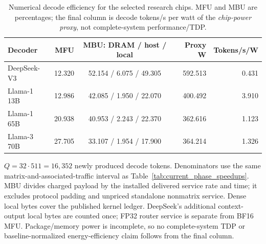 \begin{table}[htbp]
\centering\small
\caption{Numerical decode efficiency for the selected research chips.
MFU and MBU are percentages; the final column is decode tokens/s per watt
of the \emph{chip-power proxy}, not complete-system performance/TDP.}
\label{tab:decode_efficiency}
\begin{tabular}{@{}lrcrr@{}}
\toprule
Decoder & MFU & MBU: DRAM / host / local & Proxy W & Tokens/s/W \\
\midrule
DeepSeek-V3 & 12.320 & 52.154 / 6.075 / 49.305 & 592.513 & 0.431 \\
Llama-1 13B & 12.986 & 42.085 / 1.950 / 22.070 & 400.492 & 3.910 \\
Llama-1 65B & 20.938 & 40.953 / 2.243 / 22.370 & 362.616 & 1.123 \\
Llama-3 70B & 27.705 & 33.107 / 1.954 / 17.900 & 364.214 & 1.326 \\
\bottomrule
\end{tabular}
\par\smallskip\begin{minipage}{\linewidth}\footnotesize
$Q=32\cdot511=16{,}352$ newly produced decode tokens. Denominators use
the same matrix-and-associated-traffic interval as
Table~\ref{tab:current_phase_speedups}. MBU divides charged payload by the
installed delivered service rate and time; it excludes protocol padding and
unpriced standalone nonmatrix service. Dense local bytes cover the published
kernel ledger. DeepSeek's additional context-output local bytes are counted
once; FP32 router service is separate from BF16 MFU. Package/memory power is
incomplete, so no complete-system TDP or baseline-normalized energy-efficiency
claim follows from the final column.
\end{minipage}
\end{table}
